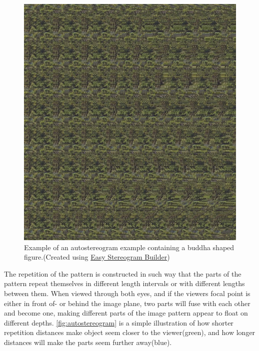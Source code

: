 \begin{figure}[H]
	\centering
	\includegraphics[width=1\linewidth]{figure/Analysis/autostereogram.jpg}
	\caption{Example of an autostereogram example containing a buddha shaped figure.(Created using \href{http://www.easystereogrambuilder.com/3d-stereogram-maker.aspx}{\color{blue}Easy Stereogram Builder})}
	\label{fig:autostereogramExample}
\end{figure}

The repetition of the pattern is constructed in such way that the parts of the pattern repeat themselves in different length intervals or with different lengths between them. When viewed through both eyes, and if the viewers focal point is either in front of- or behind the image plane, two parts will fuse with each other and become one, making different parts of the image pattern appear to float on different depths\citep{autostereogramNguyen}. \autoref{fig:autostereogram} is a simple illustration of how shorter repetition distances make object seem closer to the viewer(green), and how longer distances will make the parts seem further away(blue). 

